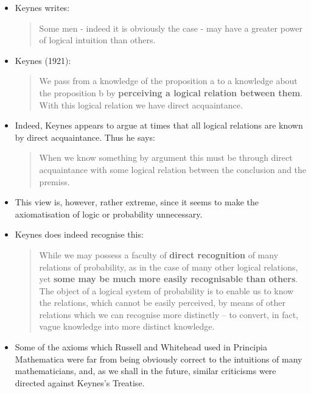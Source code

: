 \documentclass[usenames,dvipsnames, 10pt]{beamer}
\begin{document}
\begin{frame}
	\begin{itemize}
		\frametitle{Acquaintance}
		

		\item Keynes writes:
		
		\begin{quote}
			Some men - indeed it is obviously the case - may have a greater power of logical intuition than others.
		\end{quote}

		\pause
		\item Keynes (1921):
		
		\begin{quote}
			We pass from a knowledge of the proposition a to a knowledge about the
			proposition b by \textbf{perceiving a logical relation between them}. With this logical
			relation we have direct acquaintance.
		\end{quote}
		
		\pause
		\item Indeed, Keynes appears to argue
		at times that all logical relations are known by direct acquaintance. Thus he
		says:
		
		\begin{quote}
			When we know something by argument this must be through direct
			acquaintance with some logical relation between the conclusion and the premiss.
		\end{quote}	
	\end{itemize}
\end{frame}

\begin{frame}
	\begin{itemize}
		\item This view is, however, rather extreme, since it seems to make the axiomatisation
		of logic or probability unnecessary.
		
		
		\pause
		\item  Keynes does indeed recognise this:
		
		\begin{quote}
			While we may possess a faculty of \textbf{direct recognition} of many relations of
			probability, as in the case of many other logical relations, yet \textbf{some may be
			much more easily recognisable than others}. The object of a logical system of
			probability is to enable us to know the relations, which cannot be easily
			perceived, by means of other relations which we can recognise more distinctly
			– to convert, in fact, vague knowledge into more distinct knowledge.
		\end{quote}		
		
		
		\item Some of the axioms which Russell and Whitehead used in Principia Mathematica were far from being obviously correct to the intuitions of many
		mathematicians, and, as we shall in the future, similar criticisms were	directed against Keynes's Treatise.
	\end{itemize}
\end{frame}
\end{document}
